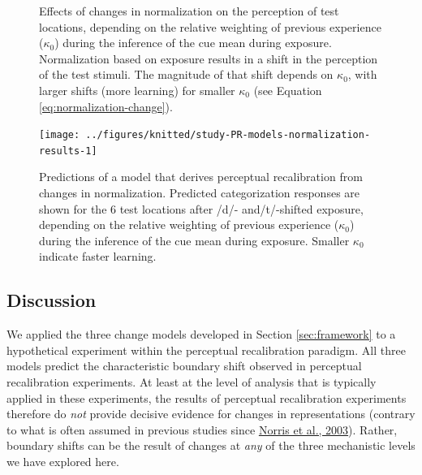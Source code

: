 \documentclass[
  11pt,
  english,
  man,floatsintext]{apa6}
\begin{document}
\begin{figure}

{\centering {}

}

\caption[Effects of changes in normalization on the perception of test locations, depending on the relative weighting of previous experience (\(\kappa_0\)) during the inference of the cue mean during exposure. Normalization based on exposure results in a shift in the perception of the test stimuli. The magnitude of that shift depends on \(\kappa_0\), with larger shifts (more learning) for smaller \(\kappa_0\) (see Equation \eqref{eq:normalization-change}).]{Effects of changes in normalization on the perception of test locations, depending on the relative weighting of previous experience (\(\kappa_0\)) during the inference of the cue mean during exposure. Normalization based on exposure results in a shift in the perception of the test stimuli. The magnitude of that shift depends on \(\kappa_0\), with larger shifts (more learning) for smaller \(\kappa_0\) (see Equation \eqref{eq:normalization-change}).}\label{fig:PR-test-normalization}
\end{figure}



\begin{figure}

{\centering \texttt{[image: ../figures/knitted/study-PR-models-normalization-results-1]} 

}

\caption{Predictions of a model that derives perceptual recalibration from changes in normalization. Predicted categorization responses are shown for the 6 test locations after /d/- and/t/-shifted exposure, depending on the relative weighting of previous experience (\(\kappa_0\)) during the inference of the cue mean during exposure. Smaller \(\kappa_0\) indicate faster learning.}\label{fig:study-PR-models-normalization-results}
\end{figure}

\hypertarget{discussion}{%
\subsection{Discussion}\label{discussion}}

We applied the three change models developed in Section \ref{sec:framework} to a hypothetical experiment within the perceptual recalibration paradigm. All three models predict the characteristic boundary shift observed in perceptual recalibration experiments. At least at the level of analysis that is typically applied in these experiments, the results of perceptual recalibration experiments therefore do \emph{not} provide decisive evidence for changes in representations (contrary to what is often assumed in previous studies since \protect\hyperlink{ref-norris2003}{Norris et al., 2003}). Rather, boundary shifts can be the result of changes at \emph{any} of the three mechanistic levels we have explored here.
\end{document}
